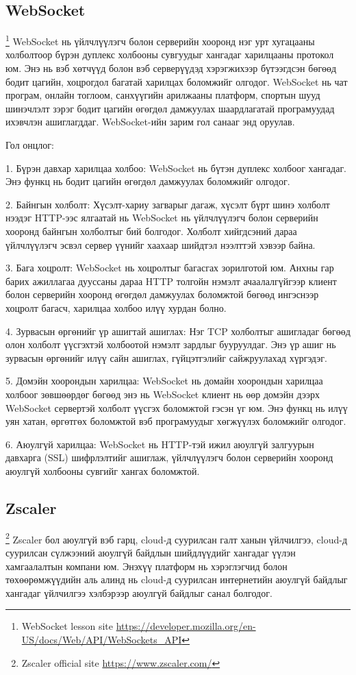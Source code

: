 \subsection{WebSocket}
			\footnote{WebSocket lesson site \url{https://developer.mozilla.org/en-US/docs/Web/API/WebSockets_API}}
				\quad \quad WebSocket нь үйлчлүүлэгч болон серверийн хооронд нэг урт хугацааны холболтоор бүрэн дуплекс холбооны сувгуудыг хангадаг харилцааны протокол юм. Энэ нь вэб хөтчүүд болон вэб серверүүдэд хэрэгжихээр бүтээгдсэн бөгөөд бодит цагийн, хоцрогдол багатай харилцах боломжийг олгодог. WebSocket нь чат програм, онлайн тоглоом, санхүүгийн арилжааны платформ, спортын шууд шинэчлэлт зэрэг бодит цагийн өгөгдөл дамжуулах шаардлагатай програмуудад ихэвчлэн ашиглагддаг. WebSocket-ийн зарим гол санааг энд оруулав.

				Гол онцлог:
				
				1. Бүрэн давхар харилцаа холбоо: WebSocket нь бүтэн дуплекс холбоог хангадаг. Энэ функц нь бодит цагийн өгөгдөл дамжуулах боломжийг олгодог.
				
				2. Байнгын холболт: Хүсэлт-хариу загварыг дагаж, хүсэлт бүрт шинэ холболт нээдэг HTTP-ээс ялгаатай нь WebSocket нь үйлчлүүлэгч болон серверийн хооронд байнгын холболтыг бий болгодог. Холболт хийгдсэний дараа үйлчлүүлэгч эсвэл сервер үүнийг хаахаар шийдтэл нээлттэй хэвээр байна.
				
				3. Бага хоцролт: WebSocket нь хоцролтыг багасгах зорилготой юм. Анхны гар барих ажиллагаа дууссаны дараа HTTP толгойн нэмэлт ачаалалгүйгээр клиент болон серверийн хооронд өгөгдөл дамжуулах боломжтой бөгөөд ингэснээр хоцролт багасч, харилцаа холбоо илүү хурдан болно.
				
				4. Зурвасын өргөнийг үр ашигтай ашиглах: Нэг TCP холболтыг ашигладаг бөгөөд олон холболт үүсгэхтэй холбоотой нэмэлт зардлыг бууруулдаг. Энэ үр ашиг нь зурвасын өргөнийг илүү сайн ашиглах, гүйцэтгэлийг сайжруулахад хүргэдэг.
				
				5. Домэйн хоорондын харилцаа: WebSocket нь домайн хоорондын харилцаа холбоог зөвшөөрдөг бөгөөд энэ нь WebSocket клиент нь өөр домэйн дээрх WebSocket сервертэй холболт үүсгэх боломжтой гэсэн үг юм. Энэ функц нь илүү уян хатан, өргөтгөх боломжтой вэб програмуудыг хөгжүүлэх боломжийг олгодог.
				
				6. Аюулгүй харилцаа: WebSocket нь HTTP-тэй ижил аюулгүй залгуурын давхарга (SSL) шифрлэлтийг ашиглаж, үйлчлүүлэгч болон серверийн хооронд аюулгүй холбооны сувгийг хангах боломжтой.			

\subsection{Zscaler}
				\footnote{Zscaler official site \url{https://www.zscaler.com/}}
					\quad \quad Zscaler бол аюулгүй вэб гарц, cloud-д суурилсан галт ханын үйлчилгээ, cloud-д суурилсан сүлжээний аюулгүй байдлын шийдлүүдийг хангадаг үүлэн хамгаалалтын компани юм. Энэхүү платформ нь хэрэглэгчид болон төхөөрөмжүүдийн аль алинд нь cloud-д суурилсан интернетийн аюулгүй байдлыг хангадаг үйлчилгээ хэлбэрээр аюулгүй байдлыг санал болгодог.

